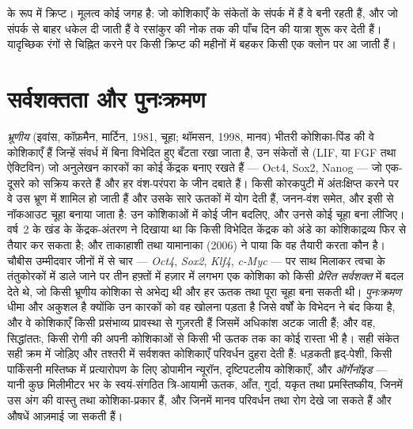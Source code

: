 \begin{omfigure}
{\small {} के रूप में क्रिप्ट। मूलत्व कोई जगह है: जो कोशिकाएँ  के संकेतों के संपर्क में हैं वे  बनी रहती हैं, और
जो संपर्क से बाहर धकेल दी जाती हैं वे रसांकुर की नोक तक की पाँच दिन की
यात्रा शुरू कर देती हैं। यादृच्छिक रंगों से चिह्नित करने पर किसी
क्रिप्ट की  महीनों में बहकर किसी एक क्लोन पर आ जाती हैं।}
\end{omfigure}

\section{सर्वशक्तता और पुनःक्रमण}

\begin{definition}[भ्रूणीय, प्रेरित, और संवर्धित]\label{def:b3:stem-cells:pluripotency}
\emph{भ्रूणीय } (इवांस, कॉफ़मैन, मार्टिन, 1981, चूहा;
थॉमसन, 1998, मानव) भीतरी कोशिका-पिंड की वे कोशिकाएँ हैं जिन्हें संवर्ध
में बिना विभेदित हुए बँटता रखा जाता है, उन संकेतों से (LIF, या FGF तथा
ऐक्टिविन) जो अनुलेखन कारकों का कोई केंद्रक बनाए रखते हैं --- Oct4,
Sox2, Nanog --- जो एक-दूसरे को सक्रिय करते हैं और हर वंश-परंपरा के जीन
दबाते हैं। किसी कोरकपुटी में अंतःक्षिप्त करने पर वे उस भ्रूण में शामिल
हो जाती हैं और उसके सारे ऊतकों में योग देती हैं, जनन-वंश समेत, और इसी
से नॉकआउट चूहा बनाया जाता है: उन कोशिकाओं में कोई जीन बदलिए, और उनसे कोई
चूहा बना लीजिए। वर्ष~2 के खंड के केंद्रक-अंतरण ने दिखाया था कि किसी
विभेदित केंद्रक को अंडे का कोशिकाद्रव्य फिर से तैयार कर सकता है; और
ताकाहाशी तथा यामानाका (2006) ने पाया कि वह तैयारी करता कौन है। चौबीस
उम्मीदवार जीनों में से चार --- \emph{Oct4}, \emph{Sox2}, \emph{Klf4},
\emph{c-Myc} ---  पर साथ मिलाकर त्वचा के तंतुकोरकों में डाले
जाने पर तीन हफ़्तों में हज़ार में लगभग एक कोशिका को किसी
\emph{प्रेरित सर्वशक्त } में बदल देते थे, जो किसी भ्रूणीय
कोशिका से अभेद्य थी और हर ऊतक तथा पूरा चूहा बना सकती थी।
\emph{पुनःक्रमण} धीमा और अकुशल है क्योंकि उन कारकों को वह 
खोलना पड़ता है जिसे वर्षों के विभेदन ने बंद किया है, और वे कोशिकाएँ
किसी प्रसंभाव्य प्रावस्था से गुज़रती हैं जिसमें अधिकांश अटक जाती हैं;
और वह, सिद्धांततः, किसी रोगी की अपनी कोशिकाओं से किसी भी ऊतक तक का कोई
रास्ता भी है। सही संकेत सही क्रम में जोड़िए और तश्तरी में सर्वशक्त
कोशिकाएँ परिवर्धन दुहरा देती हैं: धड़कती हृद्-पेशी, किसी पार्किंसनी
मस्तिष्क में प्रत्यारोपण के लिए डोपामीन न्यूरॉन, दृष्टिपटलीय कोशिकाएँ,
और \emph{ऑर्गेनॉइड} --- यानी कुछ मिलीमीटर भर के स्वयं-संगठित
त्रि-आयामी ऊतक, आँत, गुर्दा, यकृत तथा प्रमस्तिष्कीय, जिनमें उस अंग की
वास्तु तथा कोशिका-प्रकार हैं, और जिनमें मानव परिवर्धन तथा रोग देखे जा
सकते हैं और औषधें आज़माई जा सकती हैं।
\end{definition}

